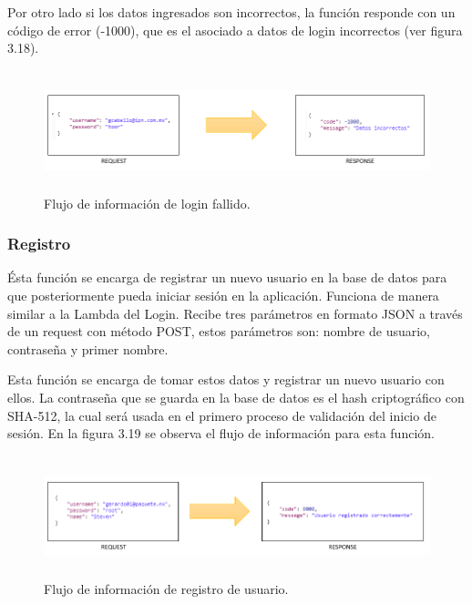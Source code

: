 Por otro lado si los datos ingresados son incorrectos, la función responde con un código de error (-1000), que es el asociado a datos de login incorrectos (ver figura 3.18). 
\begin{figure}[h!]
	\centering
	\includegraphics[width=15cm,height=3.5cm]{imagenes/desarrollo/arquitectura/LOGIN_FAIL.png}
	\caption{Flujo de información de login fallido.}
	\label{fig:loginfail}
\end{figure}

\subsubsection{Registro}
Ésta función se encarga de registrar un nuevo usuario en la base de datos para que posteriormente pueda iniciar sesión en la aplicación. Funciona de manera similar a la Lambda del Login. Recibe tres parámetros en formato JSON a través de un request con método POST, estos parámetros son: nombre de usuario, contraseña y primer nombre. \par
Esta función se encarga de tomar estos datos y registrar un nuevo usuario con ellos. La contraseña que se guarda en la base de datos es el hash criptográfico con SHA-512, la cual será usada en el primero proceso de validación del inicio de sesión. En la figura 3.19 se observa el flujo de información para esta función.
\begin{figure}[h!]
	\centering
	\includegraphics[width=15cm,height=3.5cm]{imagenes/desarrollo/arquitectura/REGISTER_SUCCESS.png}
	\caption{Flujo de información de registro de usuario.}
	\label{fig:regsuccess}
\end{figure}

